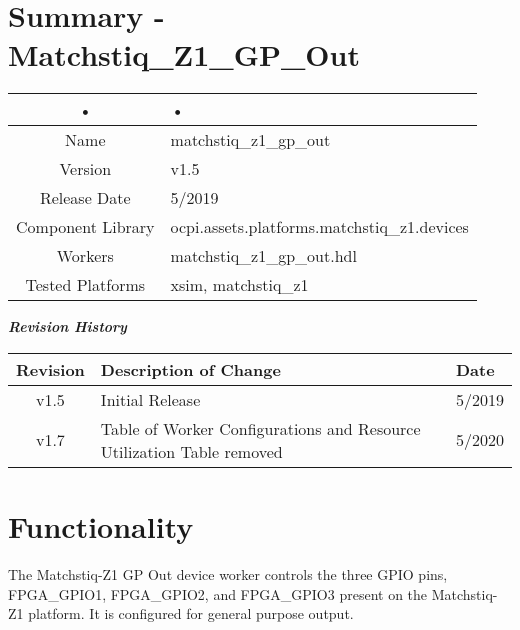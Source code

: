\documentclass{article}
\author{} %
\date{Version \docVersion} %
\title{\docTitle}
\begin{document}
\section*{Summary - Matchstiq\_Z1\_GP\_Out}
	\begin{tabular}{|c|M{13.5cm}|}
		\hline
		• & • \\
		\hline
		Name & matchstiq\_z1\_gp\_out \\
		\hline
		Version & v1.5 \\
		\hline
		Release Date & 5/2019 \\
		\hline
		Component Library & ocpi.assets.platforms.matchstiq\_z1.devices \\
		\hline
		Workers & matchstiq\_z1\_gp\_out.hdl \\
		\hline
		Tested Platforms & xsim, matchstiq\_z1 \\
		\hline
	\end{tabular}
	
\begin{center}
	\textit{\textbf{Revision History}}
		\begin{table}[H]
		\label{table:revisions} %
			\begin{tabularx}{\textwidth}{|c|X|l|}
			\hline
			\rowcolor{blue}
			\textbf{Revision} & \textbf{Description of Change} & \textbf{Date} \\
		    \hline
		    v1.5 & Initial Release & 5/2019 \\
		    \hline
		    v1.7 & Table of Worker Configurations and Resource Utilization Table removed & 5/2020 \\
			\hline
			\end{tabularx}
		\end{table}
	\end{center}	
	
\section*{Functionality}
\begin{flushleft}
The Matchstiq-Z1 GP Out device worker controls the three GPIO pins, FPGA\_GPIO1, FPGA\_GPIO2, and FPGA\_GPIO3 present on the Matchstiq-Z1 platform. It is configured for general purpose output.

\end{flushleft}
\end{document}
